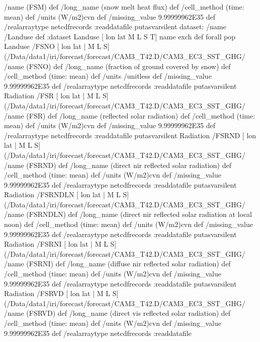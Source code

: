 \begin{ingrid}
{/name (FSM) def
 /long_name (snow melt heat flux) def
 /cell_method (time: mean) def
 /units (W/m2)cvn def
 /missing_value 9.99999962E35 def
 /realarraytype netcdfrecords :readdatafile
}putasvarsilent
dataset: /name /Landuse def :dataset
Landuse [ lon lat M L S T] {name exch def} forall pop
Landuse /FSNO{
[ lon lat | M L S] (/Data/data1/iri/forecast/forecast/CAM3_T42.D/CAM3_EC3_SST_GHG/%
/name (FSNO) def
 /long_name (fraction of ground covered by snow) def
 /cell_method (time: mean) def
 /units /unitless def
 /missing_value 9.99999962E35 def
 /realarraytype netcdfrecords :readdatafile
}putasvarsilent
Radiation /FSR{
[ lon lat | M L S] (/Data/data1/iri/forecast/forecast/CAM3_T42.D/CAM3_EC3_SST_GHG/%
/name (FSR) def
 /long_name (reflected solar radiation) def
 /cell_method (time: mean) def
 /units (W/m2)cvn def
 /missing_value 9.99999962E35 def
 /realarraytype netcdfrecords :readdatafile
}putasvarsilent
Radiation /FSRND{
[ lon lat | M L S] (/Data/data1/iri/forecast/forecast/CAM3_T42.D/CAM3_EC3_SST_GHG/%
/name (FSRND) def
 /long_name (direct nir reflected solar radiation) def
 /cell_method (time: mean) def
 /units (W/m2)cvn def
 /missing_value 9.99999962E35 def
 /realarraytype netcdfrecords :readdatafile
}putasvarsilent
Radiation /FSRNDLN{
[ lon lat | M L S] (/Data/data1/iri/forecast/forecast/CAM3_T42.D/CAM3_EC3_SST_GHG/%
/name (FSRNDLN) def
 /long_name (direct nir reflected solar radiation at local noon) def
 /cell_method (time: mean) def
 /units (W/m2)cvn def
 /missing_value 9.99999962E35 def
 /realarraytype netcdfrecords :readdatafile
}putasvarsilent
Radiation /FSRNI{
[ lon lat | M L S] (/Data/data1/iri/forecast/forecast/CAM3_T42.D/CAM3_EC3_SST_GHG/%
/name (FSRNI) def
 /long_name (diffuse nir reflected solar radiation) def
 /cell_method (time: mean) def
 /units (W/m2)cvn def
 /missing_value 9.99999962E35 def
 /realarraytype netcdfrecords :readdatafile
}putasvarsilent
Radiation /FSRVD{
[ lon lat | M L S] (/Data/data1/iri/forecast/forecast/CAM3_T42.D/CAM3_EC3_SST_GHG/%
/name (FSRVD) def
 /long_name (direct vis reflected solar radiation) def
 /cell_method (time: mean) def
 /units (W/m2)cvn def
 /missing_value 9.99999962E35 def
 /realarraytype netcdfrecords :readdatafile
}
\end{ingrid}
